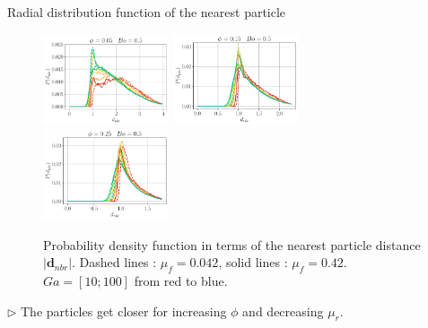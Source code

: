 \documentclass{sintefbeamer}
\begin{document}
\begin{frame}{Radial distribution function of the nearest particle}
  \begin{figure}[h!]
    \centering
    \includegraphics[width=0.33\textwidth]{image/N_10/Pcond/probaNBo0_5PHI0_05.pdf}
    \includegraphics[width=0.33\textwidth]{image/N_10/Pcond/probaNBo0_5PHI0_15.pdf}
    \includegraphics[width=0.33\textwidth]{image/N_10/Pcond/probaNBo0_5PHI0_25.pdf}
    \caption{Probability density function in terms of the nearest particle distance $|\bm{d}_{nbr}|$. Dashed lines : $\mu_f = 0.042$, solid lines : $\mu_f = 0.42$. $Ga = [10; 100]$ from red to blue. }  
\end{figure}
$\triangleright$ The particles get closer for increasing $\phi$ and decreasing $\mu_r$.
\end{frame}
\end{document}

